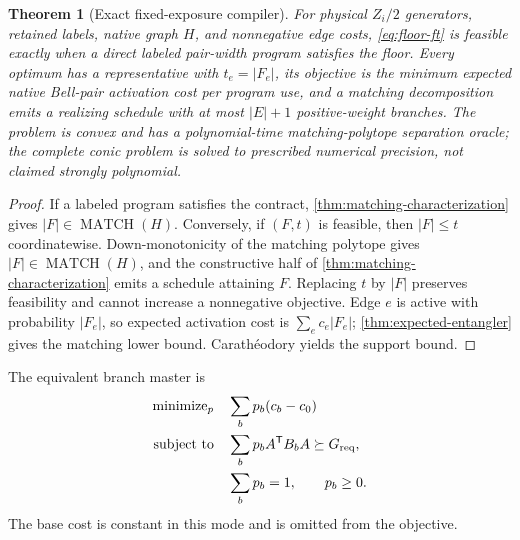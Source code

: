 \documentclass[11pt]{article}
\newtheorem{theorem}{Theorem}[section]
\theoremstyle{definition}
\theoremstyle{remark}
\newcommand{\MATCH}{\operatorname{MATCH}}
\begin{document}
\begin{theorem}[Exact fixed-exposure compiler]
\label{thm:floor-compiler}
For physical $Z_i/2$ generators, retained labels, native graph $H$, and nonnegative edge costs, \cref{eq:floor-ft} is feasible exactly when a direct labeled pair-width program satisfies the floor. Every optimum has a representative with $t_e=|F_e|$, its objective is the minimum expected native Bell-pair activation cost per program use, and a matching decomposition emits a realizing schedule with at most $|E|+1$ positive-weight branches. The problem is convex and has a polynomial-time matching-polytope separation oracle; the complete conic problem is solved to prescribed numerical precision, not claimed strongly polynomial.
\end{theorem}

\begin{proof}
If a labeled program satisfies the contract, \cref{thm:matching-characterization} gives $|F|\in\MATCH(H)$. Conversely, if $(F,t)$ is feasible, then $|F|\le t$ coordinatewise. Down-monotonicity of the matching polytope gives $|F|\in\MATCH(H)$, and the constructive half of \cref{thm:matching-characterization} emits a schedule attaining $F$. Replacing $t$ by $|F|$ preserves feasibility and cannot increase a nonnegative objective. Edge $e$ is active with probability $|F_e|$, so expected activation cost is $\sum_ec_e|F_e|$; \cref{thm:expected-entangler} gives the matching lower bound. Carath\'eodory yields the support bound.
\end{proof}

The equivalent branch master is
\begin{equation}
\begin{aligned}
  \text{minimize}_{p}\quad &\sum_b p_b(c_b-c_0)\\
  \text{subject to}\quad &\sum_bp_bA^{\mathsf T}B_bA\succeq G_{\rm req},\\
  &\sum_bp_b=1,\qquad p_b\ge0.
\end{aligned}
\label{eq:floor-branch-master}
\end{equation}
The base cost is constant in this mode and is omitted from the objective.
\end{document}
